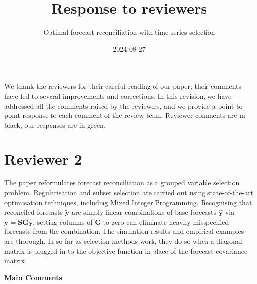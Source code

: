 \documentclass[11pt,a4paper,]{article}
\title{Response to reviewers}
\author{Optimal forecast reconciliation with time series selection}
\date{2024-08-27}
\begin{document}
\vspace*{-2cm}
\begin{snugshade}\sffamily
\maketitle
\end{snugshade}\vspace*{0.5cm}


We thank the reviewers for their careful reading of our paper; their
comments have led to several improvements and corrections. In this
revision, we have addressed all the comments raised by the reviewers,
and we provide a point-to-point response to each comment of the review
team. Reviewer comments are in black, our responses are in green.

\section*{Reviewer 2}\label{reviewer-2}

The paper reformulates forecast reconciliation as a grouped variable
selection problem. Regularisation and subset selection are carried out
using state-of-the-art optimisation techniques, including Mixed Integer
Programming. Recognising that reconciled forecasts \(\tilde{\bm{y}}\)
are simply linear combinations of base forecasts \(\hat{\bm{y}}\) via
\(\tilde{\bm{y}}=\bm{SG}\hat{\bm{y}}\), setting columns of \(\bm{G}\) to
zero can eliminate heavily misspecified forecasts from the combination.
The simulation results and empirical examples are thorough. In so far as
selection methods work, they do so when a diagonal matrix is plugged in
to the objective function in place of the forecast covariance matrix.

\textbf{Main Comments}
\end{document}
